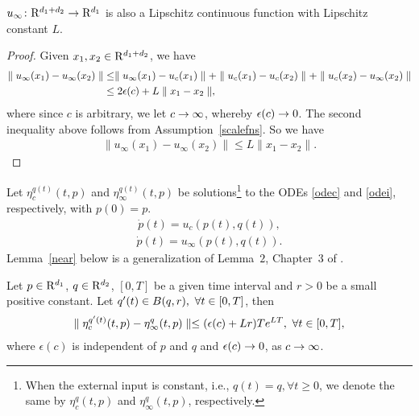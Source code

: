\begin{lemma}
$u_\infty\colon \mathrm{R}^{d_1+d_2}\rightarrow \mathrm{R}^{d_1}$ is also a Lipschitz continuous function with Lipschitz constant $L$.
\end{lemma}
\begin{proof}
Given $x_1,x_2 \in \mathrm{R}^{d_1+d_2}$, we have
\begin{align}
\parallel u_\infty(x_1)-u_\infty(x_2)\parallel &\leq\parallel u_\infty(x_1)-u_c(x_1)\parallel
+\parallel u_c(x_1)-u_c(x_2)\parallel +\parallel u_c(x_2) -u_\infty(x_2)\parallel \nonumber\\
&\leq 2\epsilon(c)+L\parallel x_1-x_2\parallel,
\end{align}
where since $c$ is arbitrary, we let $c\rightarrow \infty$, whereby $\epsilon(c)\rightarrow 0$. The second inequality above 
follows from Assumption~\ref{scalefns}. So we have
\begin{align}
\parallel u_\infty(x_1)-u_\infty(x_2)\parallel \leq L\parallel x_1-x_2\parallel.
\end{align}
\end{proof}
Let $\eta^{q(t)}_c(t,p)$ and $\eta^{q(t)}_\infty(t,p)$ be solutions\footnote{When the external input is 
constant, i.e., $q(t)=q, \forall t\geq 0$, we denote the same by $\eta^{q}_c(t,p)$ and $\eta^{q}_\infty(t,p)$,
respectively.} to the ODEs \eqref{odec} and \eqref{odei}, respectively, with $p(0)=p$. 
\begin{align}\label{odec}
\dot{p}(t)=u_c(p(t),q(t)),
\end{align}
\begin{align}\label{odei}
\dot{p}(t)=u_\infty(p(t),q(t)).
\end{align}
Lemma~\ref{near} below is a generalization of Lemma~$2$, Chapter~$3$ of \cite{SA}.
\begin{lemma}\label{near}
Let $p \in \mathrm{R}^{d_1}$, $q\in \mathrm{R}^{d_2}$, $[0,T]$ be a given time interval and $r>0$ be a small positive constant. Let $q'(t) \in B(q,r), \mbox{ } \forall t\in [0,T]$, then 
\begin{align}
\parallel \eta^{q'(t)}_c(t,p)-\eta^q_\infty(t,p)\parallel \leq (\epsilon(c)+Lr)Te^{LT}, 
\mbox{ } \forall t \in [0,T], \nonumber
\end{align}
where $\epsilon(c)$ is independent of $p$ and $q$ and $\epsilon(c) \rightarrow 0$, as $c \rightarrow \infty$.
\end{lemma}
